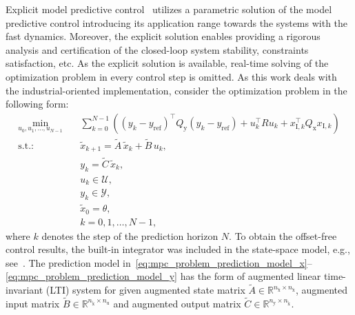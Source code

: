 \documentclass[preprint,12pt]{elsarticle}
\begin{document}
Explicit model predictive control~\cite{Bemporad_automatica} utilizes a parametric solution of the model predictive control introducing its application range towards the systems with the fast dynamics. Moreover, the explicit solution enables providing a rigorous analysis and certification of the closed-loop system stability, constraints satisfaction, etc. As the explicit solution is available, real-time solving of the optimization problem in every control step is omitted. As this work deals with the industrial-oriented implementation, consider the optimization problem in the following form:
\begin{subequations}
	\label{eq:mpc_problem}
	\begin{eqnarray}
		\label{eq:mpc_problem_cost}
		\min_{u_0,u_{1},\ldots,u_{N-1}} &~& \! \sum_{k=0}^{N-1} \! \left( (y_k-y_\mathrm{ref})^{\intercal} Q_\mathrm{y} (y_k-y_\mathrm{ref}) + u_{k}^{\intercal} R u_{k} + x_{\mathrm{I},k}^{\intercal} Q_\mathrm{x} x_{\mathrm{I},k} \right)  \\
		\label{eq:mpc_problem_prediction_model_x}
		\mathrm{s.t.\!:} &~& \widetilde{x}_{k+1} = \widetilde{A}\,\widetilde{x}_{k} + \widetilde{B}\,u_{k}, \\
		\label{eq:mpc_problem_prediction_model_y}
		&~& y_{k} = \widetilde{C}\,\widetilde{x}_{k}, \\
		\label{eq:mpc_problem_input_constraints}
		&~& u_{k} \in \mathcal{U}, \\
		\label{eq:mpc_problem_state_constraints}
		&~& y_{k} \in \mathcal{Y}, \\
		\label{eq:mpc_problem_initial_coindition}
		&~& \widetilde{x}_{0} = \theta, \\
		\label{eq:mpc_problem_k_range}
		&~& k = 0,1,\ldots, N-1,
	\end{eqnarray}
\end{subequations}
where $k$ denotes the step of the prediction horizon $N$. 
%
To obtain the offset-free control results, the built-in integrator was included in the state-space model, e.g., see~\cite{Ruscio_MPC_integral}. 
The prediction model in~\eqref{eq:mpc_problem_prediction_model_x}--\eqref{eq:mpc_problem_prediction_model_y} has the form of augmented linear time-invariant (LTI) system for given augmented state matrix $\widetilde{A} \in \mathbb{R}^{n_{\widetilde{\mathrm{x}}} \times n_{\widetilde{\mathrm{x}}}}$, augmented input matrix $\widetilde{B} \in \mathbb{R}^{n_{\widetilde{\mathrm{x}}} \times n_{\mathrm{u}}}$ and augmented output matrix $\widetilde{C} \in \mathbb{R}^{n_{\mathrm{y}} \times n_{\widetilde{\mathrm{x}}}}$. 
\end{document}
